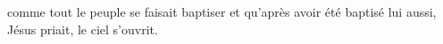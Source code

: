 \encetemps comme tout le peuple se faisait baptiser
	et qu’après avoir été baptisé lui aussi, Jésus priait,
	le ciel s’ouvrit.

